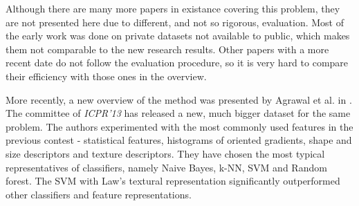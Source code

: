 Although there are many more papers in existance covering this problem, they are not presented here due to different, and not so rigorous, evaluation. Most of the early work was done on private datasets not available to public, which makes them not comparable to the new research results. Other papers with  a more recent date do not follow the evaluation procedure, so it is very hard to compare their efficiency with those ones in the overview. 

More recently, a new overview of the method was presented by Agrawal et al. in \cite{Agrawal2013}. The committee of \textit{ICPR'13} has released a new, much bigger dataset for the same problem. The authors experimented with the most commonly used features in the previous contest - statistical features, histograms of oriented gradients, shape and size descriptors and texture descriptors. They have chosen the most typical representatives of classifiers, namely Naive Bayes, k-NN, SVM and Random forest. The SVM with Law's textural representation significantly  outperformed other classifiers and feature representations.


